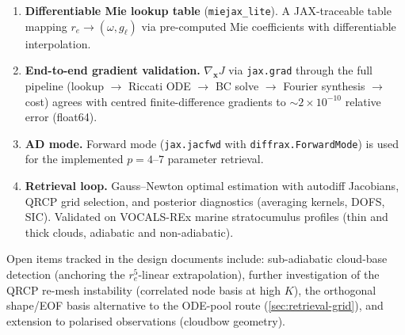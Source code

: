 \documentclass[11pt,a4paper]{article}
\newcommand{\vect}[1]{\bm{#1}}
\theoremstyle{definition}
\begin{document}
\begin{enumerate}[nosep]
  \item \textbf{Differentiable Mie lookup table} (\texttt{miejax\_lite}).
    A JAX-traceable table mapping $r_e \to (\omega, g_\ell)$ via
    pre-computed Mie coefficients with differentiable interpolation.

  \item \textbf{End-to-end gradient validation.}
    $\nabla_{\!\vect{x}} J$ via \texttt{jax.grad} through the full
    pipeline (lookup $\to$ Riccati ODE $\to$ BC solve $\to$ Fourier
    synthesis $\to$ cost) agrees with centred finite-difference
    gradients to ${\sim}2\times 10^{-10}$ relative error (float64).

  \item \textbf{AD mode.}  Forward mode (\texttt{jax.jacfwd} with
    \texttt{diffrax.ForwardMode}) is used for the implemented
    $p = 4$--$7$ parameter retrieval.

  \item \textbf{Retrieval loop.}  Gauss--Newton optimal estimation
    with autodiff Jacobians, QRCP grid selection, and posterior
    diagnostics (averaging kernels, DOFS, SIC).  Validated on
    VOCALS-REx marine stratocumulus profiles (thin and thick clouds,
    adiabatic and non-adiabatic).
\end{enumerate}

Open items tracked in the design documents include: sub-adiabatic
cloud-base detection (anchoring the $r_e^5$-linear extrapolation),
further investigation of the QRCP re-mesh instability (correlated
node basis at high $K$), the orthogonal shape/EOF basis alternative
to the ODE-pool route (\cref{sec:retrieval-grid}), and extension to
polarised observations (cloudbow geometry).
\end{document}
